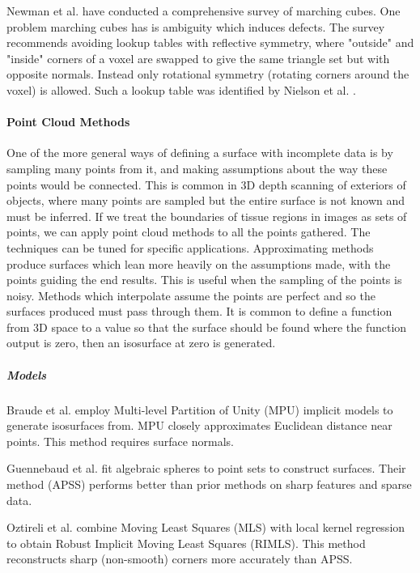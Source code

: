 \documentclass[11p, titlepage]{article}
\begin{document}
Newman et al. \cite{newman2006survey} have conducted a comprehensive survey of marching cubes. One problem marching cubes has is ambiguity which induces defects. The survey recommends avoiding lookup tables with reflective symmetry, where "outside" and "inside" corners of a voxel are swapped to give the same triangle set but with opposite normals. Instead only rotational symmetry (rotating corners around the voxel) is allowed. Such a lookup table was identified by Nielson et al. \cite{nielson2003marching}.

\paragraph{Point Cloud Methods}

One of the more general ways of defining a surface with incomplete data is by sampling many points from it, and making assumptions about the way these points would be connected. This is common in 3D depth scanning of exteriors of objects, where many points are sampled but the entire surface is not known and must be inferred. If we treat the boundaries of tissue regions in images as sets of points, we can apply point cloud methods to all the points gathered. The techniques can be tuned for specific applications. Approximating methods produce surfaces which lean more heavily on the assumptions made, with the points guiding the end results. This is useful when the sampling of the points is noisy. Methods which interpolate assume the points are perfect and so the surfaces produced must pass through them. It is common to define a function from 3D space to a value so that the surface should be found where the function output is zero, then an isosurface at zero is generated.

\subparagraph{Models}

Braude et al. \cite{braude2007contour} employ Multi-level Partition of Unity (MPU) implicit models to generate isosurfaces from. MPU closely approximates Euclidean distance near points. This method requires surface normals. 

Guennebaud et al. \cite{guennebaud2007algebraic} fit algebraic spheres to point sets to construct surfaces. Their method (APSS) performs better than prior methods on sharp features and sparse data.

Oztireli et al. \cite{oztireli2009feature} combine Moving Least Squares (MLS) with local kernel regression to obtain Robust Implicit Moving Least Squares (RIMLS). This method reconstructs sharp (non-smooth) corners more accurately than APSS.
\end{document}
